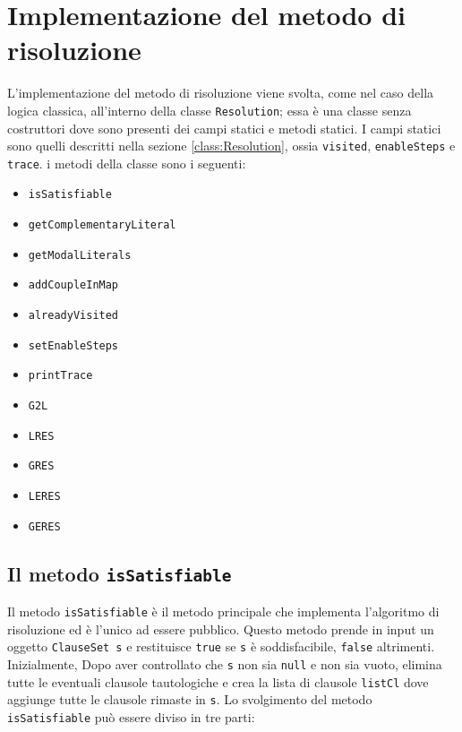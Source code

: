 \documentclass[a4paper,12pt]{report}
\begin{document}
\section{Implementazione del metodo di risoluzione}
\label{impl_res_modal}
L'implementazione del metodo di risoluzione viene svolta, come nel caso della logica classica, all'interno della classe \texttt{Resolution}; essa è una classe senza costruttori dove sono presenti dei campi statici e metodi statici. I campi statici sono quelli descritti nella sezione \ref{class:Resolution}, ossia \texttt{visited}, \texttt{enableSteps} e \texttt{trace}. i metodi della classe sono i seguenti:
\begin{itemize}
    \item \texttt{isSatisfiable}
    \item \texttt{getComplementaryLiteral}
    \item \texttt{getModalLiterals}
    \item \texttt{addCoupleInMap}
    \item \texttt{alreadyVisited}
    \item \texttt{setEnableSteps}
    \item \texttt{printTrace}
    \item \texttt{G2L}
    \item \texttt{LRES}
    \item \texttt{GRES}
    \item \texttt{LERES}
    \item \texttt{GERES}
\end{itemize}
\subsection*{Il metodo \texttt{isSatisfiable}}
Il metodo \texttt{isSatisfiable} è il metodo principale che implementa l'algoritmo di risoluzione ed è l'unico ad essere pubblico. Questo metodo prende in input un oggetto \texttt{ClauseSet s} e restituisce \texttt{true} se \texttt{s} è soddisfacibile, \texttt{false} altrimenti. Inizialmente, Dopo aver controllato che \texttt{s} non sia \texttt{null} e non sia vuoto, elimina tutte le eventuali clausole tautologiche e crea la lista di clausole \texttt{listCl} dove aggiunge tutte le clausole rimaste in \texttt{s}. Lo svolgimento del metodo \texttt{isSatisfiable} può essere diviso in tre parti:
\end{document}

